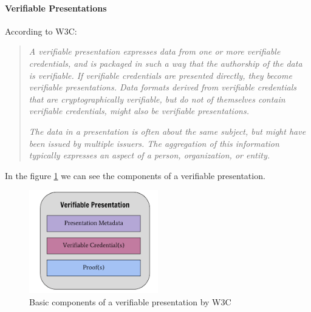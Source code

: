 \documentclass[a4paper, 12pt]{article} %
\begin{document}
                \paragraph{Verifiable Presentations}
                    According to W3C\cite{w3c-vc}:
                    \begin{quote}
                        \textit{A verifiable presentation expresses data from one or more verifiable credentials, and is packaged in such a way that the authorship of the data is verifiable. If verifiable credentials are presented directly, they become verifiable presentations. Data formats derived from verifiable credentials that are cryptographically verifiable, but do not of themselves contain verifiable credentials, might also be verifiable presentations.}
                        
                        \textit{The data in a presentation is often about the same subject, but might have been issued by multiple issuers. The aggregation of this information typically expresses an aspect of a person, organization, or entity.}
                    \end{quote}
                    In the figure \ref{fig:ssi-vp} we can see the components of a verifiable presentation.
                    \begin{figure}[ht] 
                        \centering
                        \includegraphics[width=0.5\textwidth]{ssi-vp.png}
                        \caption{Basic components of a verifiable presentation by W3C}
                        \label{fig:ssi-vp}
                    \end{figure}
\end{document}
